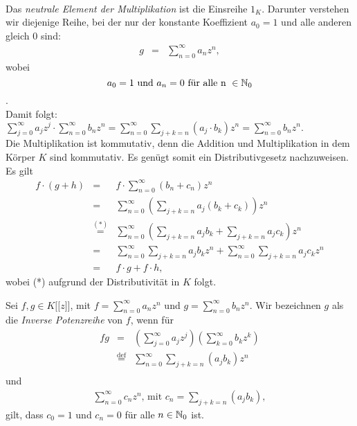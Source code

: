 {\begin{eqnarray*}
\end{eqnarray*} 
Das \textit{neutrale Element der Multiplikation} ist die Einsreihe $1_K$. Darunter verstehen wir diejenige Reihe, bei der nur der konstante Koeffizient $a_0 = 1$ und alle anderen gleich $0$ sind: 
 \begin{eqnarray*} 
 g &=& \sum_{n=0}^\infty  a_nz^n,
 \end{eqnarray*}
wobei 
 \[a_0 = 1 \text{ und } a_n = 0 \text{ für alle n } \in \mathbb{N}_0\].\\ 
Damit folgt: $ \sum_{j=0}^\infty a_jz^j \cdot \sum_{n=0}^\infty b_nz^n = \sum_{n=0}^\infty \sum_{j+k=n} \left(a_j\cdot b_k\right)z^n = \sum_{n=0}^\infty b_nz^n. $\\ 
Die Multiplikation ist kommutativ, denn die Addition und Multiplikation in dem Körper $K$ sind kommutativ. Es genügt somit ein Distributivgesetz nachzuweisen. Es gilt
\begin{eqnarray*}
f\cdot \left(g + h\right) &=& f \cdot \sum_{n=0}^\infty \left(b_n + c_n\right) z^n\\
&=& \sum_{n=0}^\infty \left(\sum_{j+k=n} a_j \left(b_k +c_k\right)\right) z^n\\
&\stackrel{\mathrm{(*)}}=& \sum_{n=0}^\infty \left(\sum_{j+k=n} a_j b_k +\sum_{j+k=n} a_j c_k\right) z^n\\
&=& \sum_{n=0}^\infty \sum_{j+k=n} a_j b_k z^n +\sum_{n=0}^\infty \sum_{j+k=n} a_j c_k z^n\\
&=& f\cdot g + f\cdot h,
\end{eqnarray*}
wobei (*) aufgrund der Distributivität in $K$ folgt.\\
 }
%
%
%
%
%
%
\begin{satz} 
Sei $f, g \in K\lbrack\lbrack z\rbrack\rbrack$, mit $f = \sum_{n=0}^\infty a_n z^n$ und $g = \sum_{n=0}^\infty b_n z^n$. Wir bezeichnen $g$ als die \textit{Inverse Potenzreihe} von $f$, wenn für
\begin{eqnarray*}
fg &=& \left( \sum_{j=0}^\infty a_j z^j \right) \left( \sum_{k=0}^\infty b_k z^k \right)\\  
&\stackrel{\mathrm{def}}=& \sum_{n=0}^\infty\sum_{j+k=n} (a_j b_k) z^n\\ 
\end{eqnarray*}
%
und 
\begin{eqnarray*}
\sum_{n= 0}^{\infty} c_nz^n \text{, mit } c_n = \sum_{j+k=n} (a_j b_k),
\end{eqnarray*}
gilt, dass $c_0 =1$ und $c_n = 0$ für alle $n\in\mathbb{N}_0$ ist.
\end{satz}
